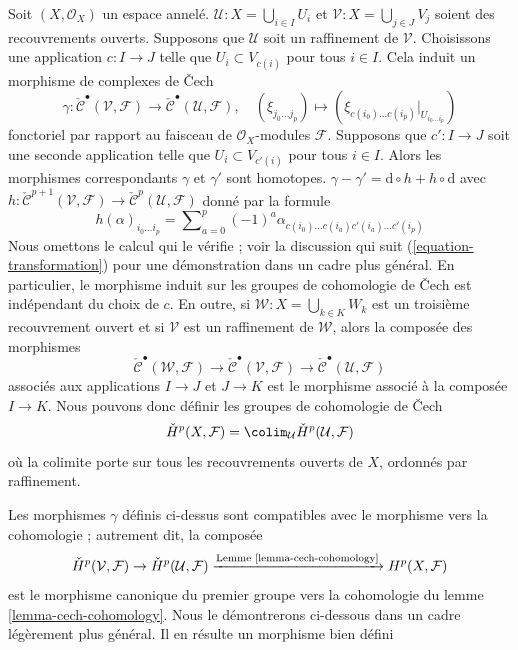 \label{section-refinements-cech}

\noindent

Soit $(X, \mathcal{O}_X)$ un espace annelé.
$\mathcal{U} : X = \bigcup_{i \in I} U_i$ et
$\mathcal{V} : X = \bigcup_{j \in J} V_j$ soient des recouvrements ouverts. Supposons que $\mathcal{U}$ soit un raffinement de $\mathcal{V}$. Choisissons une application $c : I \to J$ telle que $U_i \subset V_{c(i)}$
pour tous $i \in I$. Cela induit un morphisme de complexes de {\v C}ech
$$
\gamma :
\check{\mathcal{C}}^\bullet(\mathcal{V}, \mathcal{F})
\longrightarrow
\check{\mathcal{C}}^\bullet(\mathcal{U}, \mathcal{F}),
\quad
(\xi_{j_0 \ldots j_p})
\longmapsto
(\xi_{c(i_0) \ldots c(i_p)}|_{U_{i_0 \ldots i_p}})
$$
fonctoriel par rapport au faisceau de $\mathcal{O}_X$-modules $\mathcal{F}$. Supposons que $c' : I \to J$ soit une seconde application telle que
$U_i \subset V_{c'(i)}$ pour tous $i \in I$. Alors les morphismes correspondants
$\gamma$ et $\gamma'$ sont homotopes.
$\gamma - \gamma' = \text{d} \circ h + h \circ \text{d}$
avec
$h : \check{\mathcal{C}}^{p + 1}(\mathcal{V}, \mathcal{F}) \to
\check{\mathcal{C}}^p(\mathcal{U}, \mathcal{F})$
donné par la formule
$$
h(\alpha)_{i_0 \ldots i_p} =
\sum\nolimits_{a = 0}^{p}
(-1)^a
\alpha_{c(i_0)\ldots c(i_a) c'(i_a) \ldots c'(i_p)}
$$
Nous omettons le calcul qui le vérifie ; voir la discussion qui suit (\ref{equation-transformation}) pour une démonstration dans un cadre plus général. En particulier, le morphisme induit sur les groupes de cohomologie de {\v C}ech est indépendant du choix de $c$. En outre, si
$\mathcal{W} : X = \bigcup_{k \in K} W_k$ est un troisième recouvrement ouvert et si $\mathcal{V}$ est un raffinement de $\mathcal{W}$, alors la composée des morphismes
$$
\check{\mathcal{C}}^\bullet(\mathcal{W}, \mathcal{F})
\longrightarrow
\check{\mathcal{C}}^\bullet(\mathcal{V}, \mathcal{F})
\longrightarrow
\check{\mathcal{C}}^\bullet(\mathcal{U}, \mathcal{F})
$$
associés aux applications $I \to J$ et $J \to K$ est le morphisme associé à la composée $I \to K$. Nous pouvons donc définir les groupes de cohomologie de {\v C}ech
$$
\check{H}^p(X, \mathcal{F}) =
\colim_\mathcal{U} \check{H}^p(\mathcal{U}, \mathcal{F})
$$
où la colimite porte sur tous les recouvrements ouverts de $X$, ordonnés par raffinement.

\medskip\noindent

Les morphismes $\gamma$ définis ci-dessus sont compatibles avec le morphisme vers la cohomologie ; autrement dit, la composée
$$
\check{H}^p(\mathcal{V}, \mathcal{F}) \to
\check{H}^p(\mathcal{U}, \mathcal{F})
\xrightarrow{\text{Lemme \ref{lemma-cech-cohomology}}}
H^p(X, \mathcal{F})
$$
est le morphisme canonique du premier groupe vers la cohomologie du lemme \ref{lemma-cech-cohomology}. Nous le démontrerons ci-dessous dans un cadre légèrement plus général. Il en résulte un morphisme bien défini

